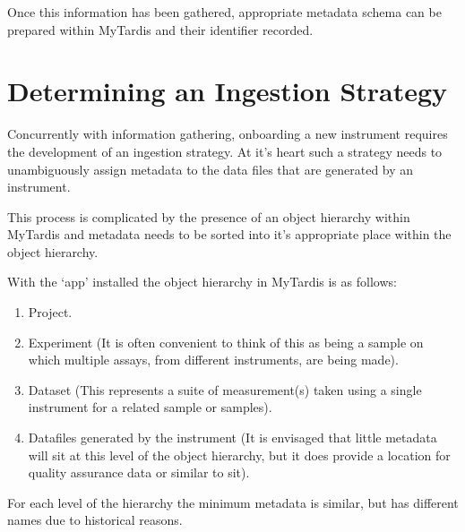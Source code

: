 \documentclass[letterpaper,10pt,english]{sphinxmanual}
\begin{document}
\sphinxAtStartPar
Once this information has been gathered, appropriate metadata schema can be prepared within MyTardis and their identifier recorded.


\section{Determining an Ingestion Strategy}
\label{\detokenize{index:determining-an-ingestion-strategy}}\label{\detokenize{index:ingestion-strat}}
\sphinxAtStartPar
Concurrently with information gathering, onboarding a new instrument requires the development of an ingestion strategy. At it’s heart such a strategy needs to unambiguously assign metadata to the data files that are generated by an instrument.

\sphinxAtStartPar
This process is complicated by the presence of an object hierarchy within MyTardis and metadata needs to be sorted into it’s appropriate place within the object hierarchy.

\sphinxAtStartPar
With the  ‘app’ installed the object hierarchy in MyTardis is as follows:
\begin{enumerate}
%
\item {} 
\sphinxAtStartPar
Project.

\item {} 
\sphinxAtStartPar
Experiment (It is often convenient to think of this as being a sample on which multiple assays, from different instruments, are being made).

\item {} 
\sphinxAtStartPar
Dataset (This represents a suite of measurement(s) taken using a single instrument for a related sample or samples).

\item {} 
\sphinxAtStartPar
Datafiles generated by the instrument (It is envisaged that little metadata will sit at this level of the object hierarchy, but it does provide a location for quality assurance data or similar to sit).

\end{enumerate}

\sphinxAtStartPar
For each level of the hierarchy the minimum metadata is similar, but has different names due to historical reasons.
\end{document}
